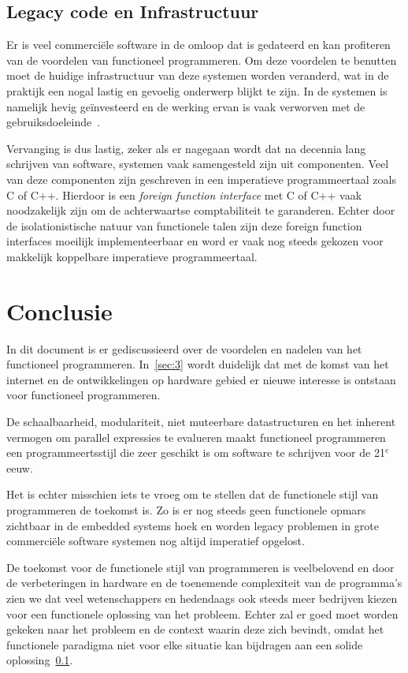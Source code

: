 \documentclass[twoside,twocolumn]{article}
\begin{document}
\subsection{Legacy code en Infrastructuur}
\label{subsec:4-2}

Er is veel commerci\"ele software in de omloop dat is gedateerd en kan
profiteren van de voordelen van functioneel programmeren. Om deze voordelen te
benutten moet de huidige infrastructuur van deze systemen worden veranderd, wat
in de praktijk een nogal lastig en gevoelig onderwerp blijkt te zijn. In de
systemen is namelijk hevig ge\"investeerd en de werking ervan is vaak verworven
met de gebruiksdoeleinde~\cite{src18,src25}.

Vervanging is dus lastig, zeker als er nagegaan wordt dat na decennia lang
schrijven van software, systemen vaak samengesteld zijn uit componenten. Veel
van deze componenten zijn geschreven in een imperatieve programmeertaal zoals C
of C++. Hierdoor is een \textit{foreign function interface} met C of C++ vaak
noodzakelijk zijn om de achterwaartse comptabiliteit te garanderen\cite{src19}.
Echter door de isolationistische natuur van functionele talen zijn deze foreign
function interfaces moeilijk implementeerbaar en word er vaak nog steeds
gekozen voor makkelijk koppelbare imperatieve programmeertaal.

\section{Conclusie}
\label{sec:5}

In dit document is er gediscussieerd over de voordelen en nadelen van het
functioneel programmeren. In~\cref{sec:3} wordt duidelijk dat met de komst van
het internet en de ontwikkelingen op hardware gebied er nieuwe interesse is
ontstaan voor functioneel programmeren.

De schaalbaarheid, modulariteit, niet muteerbare datastructuren en het inherent
vermogen om parallel expressies te evalueren maakt functioneel programmeren een
programmeertsstijl die zeer geschikt is om software te schrijven voor de 21$^e$
eeuw.

Het is echter misschien iets te vroeg om te stellen dat de functionele stijl
van programmeren de toekomst is. Zo is er nog steeds geen functionele opmars
zichtbaar in de embedded systems hoek en worden legacy problemen in grote
commerci\"ele software systemen nog altijd imperatief opgelost.

De toekomst voor de functionele stijl van programmeren is veelbelovend en door
de verbeteringen in hardware en de toenemende complexiteit van de programma's
zien we dat veel wetenschappers en hedendaags ook steeds meer bedrijven kiezen
voor een functionele oplossing van het probleem. Echter zal er goed moet worden
gekeken naar het probleem en de context waarin deze zich bevindt, omdat
het functionele paradigma niet voor elke situatie kan bijdragen aan een solide
oplossing~\cref{subsec:4-2}.
\end{document}
